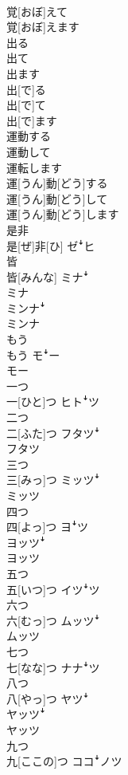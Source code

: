 \documentclass[8pt]{extreport}
\begin{document}
\begin{CJK}{UTF8}{min}
\\	覚[おぼ]えて 
\\	覚[おぼ]えます	
\\	出る 
\\	出て 
\\	出ます	
\\	出[で]る 
\\	出[で]て 
\\	出[で]ます	
\\	運動する 
\\	運動して 
\\	運転します	
\\	運[うん]動[どう]する 
\\	運[うん]動[どう]して 
\\	運[うん]動[どう]します	
\\	是非	
\\	是[ぜ]非[ひ]	ゼꜜヒ
\\	皆	
\\	皆[みんな]	ミナꜜ 
\\	ミナ 
\\	ミンナꜜ 
\\	ミンナ
\\	もう	
\\	もう	モꜜー 
\\	モー
\\	一つ	
\\	一[ひと]つ	ヒトꜜツ
\\	二つ	
\\	二[ふた]つ	フタツꜜ 
\\	フタツ
\\	三つ	
\\	三[みっ]つ	ミッツꜜ 
\\	ミッツ
\\	四つ	
\\	四[よっ]つ	ヨꜜツ 
\\	ヨッツꜜ 
\\	ヨッツ
\\	五つ	
\\	五[いつ]つ	イツꜜツ
\\	六つ	
\\	六[むっ]つ	ムッツꜜ 
\\	ムッツ
\\	七つ	
\\	七[なな]つ	ナナꜜツ
\\	八つ	
\\	八[やっ]つ	ヤツꜜ 
\\	ヤッツꜜ 
\\	ヤッツ
\\	九つ	
\\	九[ここの]つ	ココꜜノツ

\end{CJK}
\end{document}
